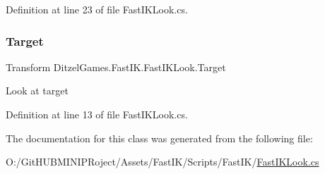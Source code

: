Definition at line 23 of file Fast\+I\+K\+Look.\+cs.

\mbox{\label{class_ditzel_games_1_1_fast_i_k_1_1_fast_i_k_look_af51e777803a90152c88eadac0fa870d4}} 
\subsubsection{\texorpdfstring{Target}{Target}}
{\footnotesize\ttfamily Transform Ditzel\+Games.\+Fast\+I\+K.\+Fast\+I\+K\+Look.\+Target}



Look at target 



Definition at line 13 of file Fast\+I\+K\+Look.\+cs.



The documentation for this class was generated from the following file\+:\begin{DoxyCompactItemize}
\item 
O\+:/\+Git\+H\+U\+B\+M\+I\+N\+I\+P\+Roject/\+Assets/\+Fast\+I\+K/\+Scripts/\+Fast\+I\+K/\mbox{\hyperlink{_fast_i_k_look_8cs}{Fast\+I\+K\+Look.\+cs}}\end{DoxyCompactItemize}
